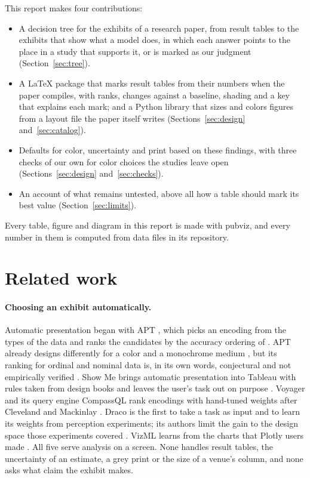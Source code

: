 \documentclass[11pt]{article}
\begin{document}
This report makes four contributions:
\begin{itemize}
  \item A decision tree for the exhibits of a research paper, from result
    tables to the exhibits that show what a model does, in which each
    answer points to the place in a study that supports it, or is marked as
    our judgment (Section~\ref{sec:tree}).
  \item A LaTeX package that marks result tables from their numbers when the
    paper compiles, with ranks, changes against a baseline, shading and a key
    that explains each mark; and a Python library that sizes and colors
    figures from a layout file the paper itself writes
    (Sections~\ref{sec:design} and~\ref{sec:catalog}).
  \item Defaults for color, uncertainty and print based on these findings,
    with three checks of our own for color choices the studies leave open
    (Sections~\ref{sec:design} and~\ref{sec:checks}).
  \item An account of what remains untested, above all how a table should
    mark its best value (Section~\ref{sec:limits}).
\end{itemize}
Every table, figure and diagram in this report is made with pubviz, and
every number in them is computed from data files in its repository.

\section{Related work}\label{sec:related}

\paragraph{Choosing an exhibit automatically.} Automatic presentation began
with APT \citep{mackinlay1986apt}, which picks an encoding from the types of
the data and ranks the candidates by the accuracy ordering of
\citet{cleveland1984graphical}. APT already designs differently for a color
and a monochrome medium \citep[Sec.~9]{mackinlay1986apt}, but its ranking for
ordinal and nominal data is, in its own words, conjectural and not
empirically verified \citep[p.~124]{mackinlay1986apt}. Show Me brings
automatic presentation into Tableau with rules taken from design books and
leaves the user's task out on purpose \citep[Sec.~1]{mackinlay2007showme}.
Voyager and its query engine CompassQL rank encodings with hand-tuned weights
after Cleveland and Mackinlay
\citep{wongsuphasawat2016voyager,wongsuphasawat2016compassql}. Draco is the
first to take a task as input and to learn its weights from perception
experiments; its authors limit the gain to the design space those
experiments covered \citep[Sec.~6.3]{moritz2019draco}. VizML learns from the
charts that Plotly users made \citep{hu2019vizml}. All five serve analysis on
a screen. None handles result tables, the uncertainty of an estimate, a grey
print or the size of a venue's column, and none asks what claim the exhibit
makes.
\end{document}
